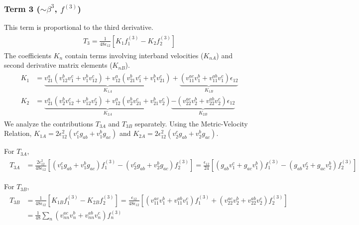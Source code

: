 \documentclass[twocolumn, prx, reprint, amsfonts, amsmath, amssymb, longbibliography, floatfix, aps]{revtex4-2}
\begin{document}
\subsubsection*{Term 3 (\texorpdfstring{$\sim \beta^3$}{beta3}, \texorpdfstring{$f^{(3)}$}{f3})}
This term is proportional to the third derivative.
\begin{align}
\begin{aligned}
T_3 = \frac{1}{48\epsilon_{12}} \left[ K_1 f_1^{(3)} - K_2 f_2^{(3)} \right]
\end{aligned}
\end{align}
The coefficients $K_n$ contain terms involving interband velocities ($K_{nA}$) and second derivative matrix elements ($K_{nB}$).
\begin{align}
\begin{aligned}
K_1 &= \underbrace{v_{21}^a(v_{12}^b v_1^c + v_1^b v_{12}^c) + v_{12}^a(v_{21}^b v_1^c + v_1^b v_{21}^c)}_{K_{1A}} + \underbrace{(v_{11}^{ac}v_1^b + v_{11}^{ab}v_1^c)\epsilon_{12}}_{K_{1B}} \\
K_2 &= \underbrace{v_{21}^a(v_2^b v_{12}^c + v_{12}^b v_2^c) + v_{12}^a(v_2^b v_{21}^c + v_{21}^b v_2^c)}_{K_{2A}} \underbrace{- (v_{22}^{ac}v_2^b + v_{22}^{ab}v_2^c)\epsilon_{12}}_{K_{2B}}
\end{aligned}
\end{align}
We analyze the contributions $T_{3A}$ and $T_{3B}$ separately. Using the Metric-Velocity Relation, $K_{1A} = 2\epsilon_{12}^2 (v_1^c g_{ab} + v_1^b g_{ac})$ and $K_{2A} = 2\epsilon_{12}^2 (v_2^c g_{ab} + v_2^b g_{ac})$.

For $T_{3A}$,
\begin{align}
\begin{aligned}
T_{3A} &= \frac{2\epsilon_{12}^2}{48\epsilon_{12}} \left[ (v_1^c g_{ab} + v_1^b g_{ac}) f_1^{(3)} - (v_2^c g_{ab} + v_2^b g_{ac}) f_2^{(3)} \right] = \frac{\epsilon_{12}}{24} \left[ (g_{ab} v_1^c + g_{ac} v_1^b) f_1^{(3)} - (g_{ab} v_2^c + g_{ac} v_2^b) f_2^{(3)} \right]
\end{aligned}
\end{align}

For $T_{3B}$,
\begin{align}
\begin{aligned}
T_{3B} &= \frac{1}{48\epsilon_{12}} \left[ K_{1B} f_1^{(3)} - K_{2B} f_2^{(3)} \right] = \frac{\epsilon_{12}}{48\epsilon_{12}} \left[ (v_{11}^{ac}v_1^b + v_{11}^{ab}v_1^c) f_1^{(3)} + (v_{22}^{ac}v_2^b + v_{22}^{ab}v_2^c) f_2^{(3)} \right] \\
&= \frac{1}{48} \sum_n (v_{nn}^{ac}v_n^b + v_{nn}^{ab}v_n^c) f_n^{(3)}
\end{aligned}
\end{align}
\end{document}

